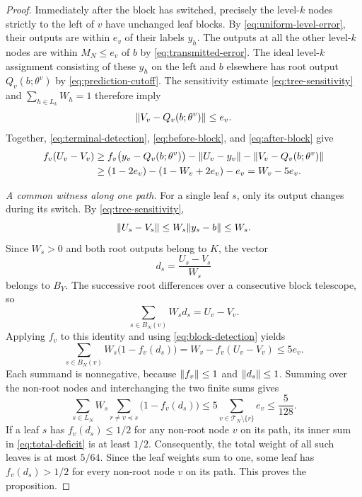 \begin{proof}
Immediately after the block has switched, precisely the level-$k$
nodes strictly to the left of $v$ have unchanged leaf blocks. By
\eqref{eq:uniform-level-error}, their outputs are within $e_v$ of their
labels $y_h$. The outputs at all the other level-$k$ nodes are within
$M_N\leq e_v$ of $b$ by \eqref{eq:transmitted-error}.
The ideal level-$k$ assignment consisting of these $y_h$ on the left
and $b$ elsewhere has root output $Q_v(b;\theta^v)$ by
\eqref{eq:prediction-cutoff}. The sensitivity estimate
\eqref{eq:tree-sensitivity} and $\sum_{h\in L_k}W_h=1$ therefore imply
\begin{equation}
  \lVert V_v-Q_v(b;\theta^v)\rVert\leq e_v.
  \label{eq:after-block}
\end{equation}
Together, \eqref{eq:terminal-detection}, \eqref{eq:before-block}, and
\eqref{eq:after-block} give
\begin{align}
  f_v(U_v-V_v)
   &\geq f_v\bigl(y_v-Q_v(b;\theta^v)\bigr)
               -\lVert U_v-y_v\rVert-\lVert V_v-Q_v(b;\theta^v)\rVert
               \notag\\
   &\geq (1-2e_v)-(1-W_v+2e_v)-e_v
    =W_v-5e_v.
  \label{eq:block-detection}
\end{align}

\emph{A common witness along one path.}
For a single leaf $s$, only its output changes during its switch.
By \eqref{eq:tree-sensitivity},
\[
  \lVert U_s-V_s\rVert\leq W_s\lVert y_s-b\rVert\leq W_s.
\]
Since $W_s>0$ and both root outputs belong to $K$, the vector
\[
  d_s=\frac{U_s-V_s}{W_s}
\]
belongs to $B_Y$. The successive root differences over a consecutive
block telescope, so
\[
  \sum_{s\in B_N(v)}W_s d_s=U_v-V_v.
\]
Applying $f_v$ to this identity and using \eqref{eq:block-detection}
yields
\begin{equation}
  \sum_{s\in B_N(v)}W_s\bigl(1-f_v(d_s)\bigr)
     =W_v-f_v(U_v-V_v)
     \leq 5e_v.
  \label{eq:weighted-deficit}
\end{equation}
Each summand is nonnegative, because $\lVert f_v\rVert\leq 1$ and
$\lVert d_s\rVert\leq 1$. Summing over the non-root nodes and interchanging the
two finite sums gives
\begin{equation}
  \sum_{s\in L_N}W_s
       \sum_{r\ne v\preceq s}\bigl(1-f_v(d_s)\bigr)
    \leq 5\sum_{v\in\mathcal T_N\setminus\{r\}}e_v
    \leq \frac{5}{128}.
  \label{eq:total-deficit}
\end{equation}
If a leaf $s$ has $f_v(d_s)\leq 1/2$ for any non-root node $v$ on its
path, its inner sum in \eqref{eq:total-deficit} is at least $1/2$. Consequently,
the total weight of all such leaves is at most $5/64$. Since the leaf
weights sum to one, some leaf has $f_v(d_s)>1/2$ for every non-root
node $v$ on its path. This proves the proposition.
\end{proof}

